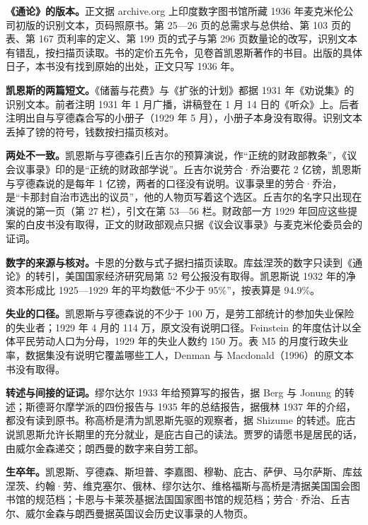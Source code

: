 \begin{deeper}[史料说明]
\textbf{《通论》的版本。}正文据 archive.org 上印度数字图书馆所藏 1936 年麦克米伦公司初版的识别文本，页码照原书。第 25—26 页的总需求与总供给、第 103 页的表、第 167 页利率的定义、第 199 页的式子与第 296 页数量论的改写，识别文本有错乱，按扫描页读取。书的定价五先令，见卷首凯恩斯著作的书目。出版的具体日子，本书没有找到原始的出处，正文只写 1936 年。

\textbf{凯恩斯的两篇短文。}《储蓄与花费》与《扩张的计划》都据 1931 年《劝说集》的识别文本。前者注明 1931 年 1 月广播，讲稿登在 1 月 14 日的《听众》上。后者注明出自与亨德森合写的小册子（1929 年 5 月），小册子本身没有取得。识别文本丢掉了镑的符号，钱数按扫描页核对。

\textbf{两处不一致。}凯恩斯与亨德森引丘吉尔的预算演说，作“正统的财政部教条”，《议会议事录》印的是“正统的财政部学说”。丘吉尔说劳合·乔治要花 2 亿镑，凯恩斯与亨德森说的是每年 1 亿镑，两者的口径没有说明。议事录里的劳合·乔治，是“卡那封自治市选出的议员”，他的人物页写着这个选区。丘吉尔的名字只出现在演说的第一页（第 27 栏），引文在第 53—56 栏。财政部一方 1929 年回应这些提案的白皮书没有取得，正文的财政部观点只据《议会议事录》与麦克米伦委员会的证词。

\textbf{数字的来源与核对。}卡恩的分数与式子据扫描页读取。库兹涅茨的数字只读到《通论》的转引，美国国家经济研究局第 52 号公报没有取得。凯恩斯说 1932 年的净资本形成比 1925—1929 年的平均数低“不少于 95\%”，按表算是 94.9\%。

\textbf{失业的口径。}凯恩斯与亨德森说的不少于 100 万，是劳工部统计的参加失业保险的失业者；1929 年 4 月的 114 万，原文没有说明口径。Feinstein 的年度估计以全体平民劳动人口为分母，1929 年的失业人数约 150 万\cite{boe2017}。表 M5 的月度行政失业率，数据集没有说明它覆盖哪些工人，Denman 与 Macdonald（1996）的原文本书没有取得。

\textbf{转述与间接的证词。}缪尔达尔 1933 年给预算写的报告，据 Berg 与 Jonung 的转述；斯德哥尔摩学派的四份报告与 1935 年的总结报告，据俄林 1937 年的介绍，都没有读到原书。称高桥是清为凯恩斯先驱的观察者，据 Shizume 的转述。庇古说凯恩斯允许长期里的充分就业，是庇古自己的读法。贾罗的请愿书是居民的话，由威尔金森递交；朗西曼的数字来自劳工部。

\textbf{生卒年。}凯恩斯、亨德森、斯坦普、李嘉图、穆勒、庇古、萨伊、马尔萨斯、库兹涅茨、约翰·劳、维克塞尔、俄林、缪尔达尔、维格福斯与高桥是清据美国国会图书馆的规范档；卡恩与卡莱茨基据法国国家图书馆的规范档；劳合·乔治、丘吉尔、威尔金森与朗西曼据英国议会历史议事录的人物页。
\end{deeper}

